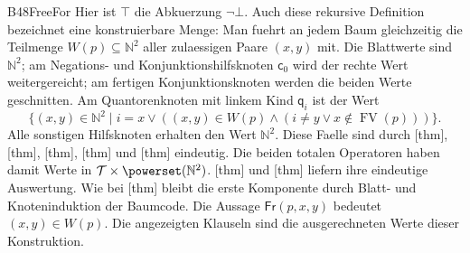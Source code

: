 {B48FreeFor}{
}
Hier ist \(\top\) die Abkuerzung \(\neg\bot\).
Auch diese rekursive Definition bezeichnet eine konstruierbare
Menge: Man fuehrt an jedem Baum gleichzeitig die Teilmenge
\(W(p)\subseteq\mathbb N^2\) aller zulaessigen Paare \((x,y)\) mit.
Die Blattwerte sind \(\mathbb N^2\); am Negations- und
Konjunktionshilfsknoten \(\mathsf c_0\) wird der rechte Wert
weitergereicht; am fertigen Konjunktionsknoten werden die beiden
Werte geschnitten. Am Quantorenknoten mit linkem Kind
\(\mathsf q_i\) ist der Wert
\[
 \{(x,y)\in\mathbb N^2\mid
    i=x\lor((x,y)\in W(p)\land
                 (i\neq y\lor x\notin\operatorname{FV}(p)))\}.
\]
Alle sonstigen Hilfsknoten erhalten den Wert \(\mathbb N^2\).
Diese Faelle sind durch
[thm],
[thm],
[thm],
[thm] und
[thm] eindeutig.
Die beiden totalen Operatoren haben damit Werte in
\(\mathcal T\times\powerset(\mathbb N^2)\).
[thm] und
[thm] liefern ihre
eindeutige Auswertung. Wie bei
[thm] bleibt die erste Komponente
durch Blatt- und Knoteninduktion der Baumcode.
Die Aussage \(\mathsf{Fr}(p,x,y)\) bedeutet
\((x,y)\in W(p)\). Die angezeigten Klauseln sind die
ausgerechneten Werte dieser Konstruktion.


